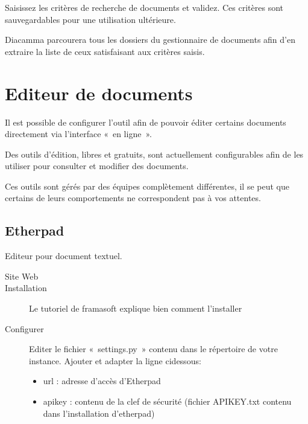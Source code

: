 \documentclass[a4paper,10pt,oneside,french]{sphinxmanual}
\begin{document}
Saisissez les critères de recherche de documents et validez. Ces critères sont sauvegardables pour une utilisation ultérieure.

Diacamma parcourera tous les dossiers du gestionnaire de documents afin d’en extraire la liste de ceux satisfaisant aux critères saisis.


\section{Editeur de documents}
\label{\detokenize{documents/editor:editeur-de-documents}}\label{\detokenize{documents/editor::doc}}
Il est possible de configurer l’outil afin de pouvoir éditer certains documents directement via l’interface « en ligne ».

Des outils d’édition, libres et gratuits, sont actuellement configurables afin de les utiliser pour consulter et modifier des documents.

 Ces outils sont gérés par des équipes complètement différentes, il se peut que certains de leurs comportements ne correspondent pas à vos attentes.


\subsection{Etherpad}
\label{\detokenize{documents/editor:etherpad}}
Editeur pour document textuel.
\begin{description}
\item[{Site Web}] \leavevmode
{}

\item[{Installation}] \leavevmode
Le tutoriel de framasoft explique bien comment l’installer

\item[{Configurer}] \leavevmode
Editer le fichier « settings.py » contenu dans le répertoire de votre instance.
Ajouter et adapter la ligne ci\sphinxhyphen{}dessous:
\begin{itemize}
\item {} 
url : adresse d’accès d’Etherpad

\item {} 
apikey : contenu de la clef de sécurité (fichier APIKEY.txt contenu dans l’installation d’etherpad)

\end{itemize}

\end{description}
\end{document}
